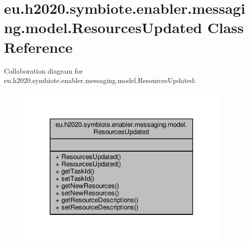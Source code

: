 \hypertarget{classeu_1_1h2020_1_1symbiote_1_1enabler_1_1messaging_1_1model_1_1ResourcesUpdated}{}\section{eu.\+h2020.\+symbiote.\+enabler.\+messaging.\+model.\+Resources\+Updated Class Reference}
\label{classeu_1_1h2020_1_1symbiote_1_1enabler_1_1messaging_1_1model_1_1ResourcesUpdated}


Collaboration diagram for eu.\+h2020.\+symbiote.\+enabler.\+messaging.\+model.\+Resources\+Updated\+:
\nopagebreak
\begin{figure}[H]
\begin{center}
\leavevmode
\includegraphics[width=296pt]{classeu_1_1h2020_1_1symbiote_1_1enabler_1_1messaging_1_1model_1_1ResourcesUpdated__coll__graph}
\end{center}
\end{figure}
